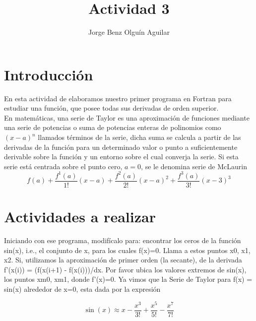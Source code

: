 \documentclass[12pt,a4paper,openright]{article}
\author{Jorge Benz Olguín Aguilar}
\title{Actividad 3}
\begin{document}
\maketitle
\section*{Introducción}

En esta actividad de elaboramos nuestro primer programa en Fortran para estudiar una función, que posee todas sus derivadas de orden superior. \\


En matemáticas, una serie de Taylor es una aproximación de funciones mediante una serie de potencias o suma de potencias enteras de polinomios como $( x-a )^n$ llamados términos de la serie, dicha suma se calcula a partir de las derivadas de la función para un determinado valor o punto a suficientemente derivable sobre la función y un entorno sobre el cual converja la serie. Si esta serie está centrada sobre el punto cero, $a=0$, se le denomina serie de McLaurin \\


$$
f(a)+\frac{f^1(a)}{1!}(x-a)+\frac{f^2(a)}{2!}(x-a)^2+\frac{f^3(a)}{3!}(x-3)^3 
$$



\section*{Actividades a realizar}


Iniciando con ese programa, modifícalo para:
encontrar los ceros de la función sin(x), i.e., el conjunto de x, para los cuales f(x)=0. Llama a estos puntos x0, x1, x2.
Si, utilizamos la aproximación de primer orden (la secante), de la derivada f'(x(i)) = (f(x(i+1) - f(x(i)))/dx. Por favor ubica los valores extremos de sin(x), los puntos xm0, xm1,  donde f'(x)=0.
Ya vimos que la Serie de Taylor para f(x) = sin(x) alrededor de x=0, esta dada por la expresión 

$$\sin(x)\approx x-\frac{x^3}{3!}+\frac{x^5}{5!}-\frac{x^7}{7!}
$$
\end{document}
